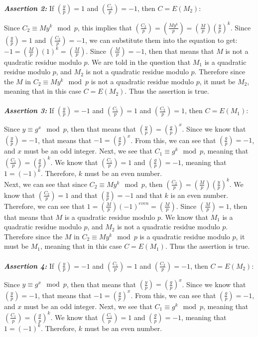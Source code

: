 \documentclass[11pt]{article}
\theoremstyle{definition}
\providecommand{\Leg}[2]{\genfrac{(}{)}{}{}{#1}{#2}}
\begin{document}
\begin{enumerate}
\textbf{\textit{Assertion 2:}} If $\Leg{y}{p} = 1$ and $\Leg{C_2}{p} = -1$, then $C = E(M_2)$:

Since $C_2 \equiv My^k \mod{p}$, this implies that $\Leg{C_2}{p} = \Leg{My^k}{p} = \Leg{M}{p} \Leg{y}{p}^k$. Since $\Leg{y}{p} = 1$ and $\Leg{C_2}{p} = -1$, we can substitute them into the equation to get: $-1 = \Leg{M}{p} (1)^k = \Leg{M}{p}$. Since $\Leg{M}{p} = -1$, then that means that $M$ is not a quadratic residue modulo $p$. We are told in the question that $M_1$ is a quadratic residue modulo $p$, and $M_2$ is not a quadratic residue modulo $p$. Therefore since the $M$ in $C_2 \equiv My^k \mod{p}$ is not a quadratic residue modulo $p$, it must be $M_2$, meaning that in this case $C = E(M_2)$. Thus the assertion is true. \\ \\


\textbf{\textit{Assertion 3:}} If $\Leg{y}{p} = -1$ and $\Leg{C_1}{p} = 1$ and $\Leg{C_2}{p} = 1$, then $C = E(M_1)$:

Since $y \equiv g^x \mod{p}$, then that means that $\Leg{y}{p} = \Leg{g}{p}^x$. Since we know that $\Leg{y}{p} = -1$, that means that $-1 = \Leg{g}{p}^x$. From this, we can see that $\Leg{g}{p} = -1$, and $x$ must be an odd integer. Next, we see that $C_1 \equiv g^k \mod{p}$, meaning that $\Leg{C_1}{p} = \Leg{g}{p}^k$. We know that $\Leg{C_1}{p} = 1$ and $\Leg{g}{p} = -1$, meaning that $1 = (-1)^k$. Therefore, $k$ must be an even number. \\

Next, we can see that since $C_2 \equiv My^k \mod{p}$, then $\Leg{C_2}{p} = \Leg{M}{p} \Leg{y}{p}^k$. We know that $\Leg{C_2}{p} = 1$ and that $\Leg{y}{p} = -1$ and that $k$ is an even number. Therefore, we can see that $1 = \Leg{M}{p} (-1)^{even} = \Leg{M}{p}$. Since $\Leg{M}{p} = 1$, then that means that $M$ is a quadratic residue modulo $p$. We know that $M_1$ is a quadratic residue modulo $p$, and $M_2$ is not a quadratic residue modulo $p$. Therefore since the $M$ in $C_2 \equiv My^k \mod{p}$ is a quadratic residue modulo $p$, it must be $M_1$, meaning that in this case $C = E(M_1)$. Thus the assertion is true. \\ \\


\textbf{\textit{Assertion 4:}} If $\Leg{y}{p} = -1$ and $\Leg{C_1}{p} = 1$ and $\Leg{C_2}{p} = -1$, then $C = E(M_2)$:

Since $y \equiv g^x \mod{p}$, then that means that $\Leg{y}{p} = \Leg{g}{p}^x$. Since we know that $\Leg{y}{p} = -1$, that means that $-1 = \Leg{g}{p}^x$. From this, we can see that $\Leg{g}{p} = -1$, and $x$ must be an odd integer. Next, we see that $C_1 \equiv g^k \mod{p}$, meaning that $\Leg{C_1}{p} = \Leg{g}{p}^k$. We know that $\Leg{C_1}{p} = 1$ and $\Leg{g}{p} = -1$, meaning that $1 = (-1)^k$. Therefore, $k$ must be an even number. \\


\end{enumerate}
\end{document}
